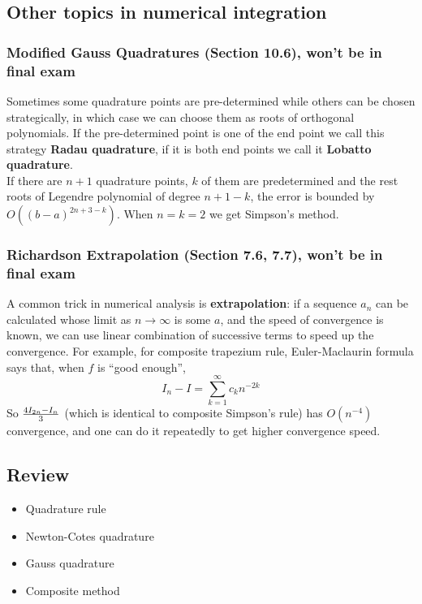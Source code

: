 \documentclass{article} %
\theoremstyle{break}
\begin{document}
\subsection{Other topics in numerical integration}

\subsubsection{Modified Gauss Quadratures (Section 10.6), won't be in final exam}

Sometimes some quadrature points are pre-determined while others can be chosen strategically, in which case we can choose them as roots of orthogonal polynomials. If the pre-determined point is one of the end point we call this strategy {\bf Radau quadrature}, if it is both end points we call it {\bf Lobatto quadrature}.\\

If there are $n+1$ quadrature points, $k$ of them are predetermined and the rest roots of Legendre polynomial of degree $n+1-k$, the error is bounded by $O((b-a)^{2n+3-k})$. When $n=k=2$ we get Simpson's method.\\


\subsubsection{Richardson Extrapolation (Section 7.6, 7.7), won't be in final exam}

A common trick in numerical analysis is {\bf extrapolation}: if a sequence $a_n$ can be calculated whose limit as $n\rightarrow \infty$ is some $a$, and the speed of convergence is known, we can use linear combination of successive terms to speed up the convergence. For example, for composite trapezium rule, Euler-Maclaurin formula says that, when $f$ is ``good enough'', 
\[I_n-I=\sum_{k=1}^\infty c_kn^{-2k}\]
So ${4I_{2n}-I_n\over 3}$ (which is identical to composite Simpson's rule) has $O(n^{-4})$ convergence, and one can do it repeatedly to get higher convergence speed.

\subsection{Review}

\begin{itemize}
\item Quadrature rule
\item Newton-Cotes quadrature
\item Gauss quadrature
\item Composite method
\end{itemize}
\end{document}
